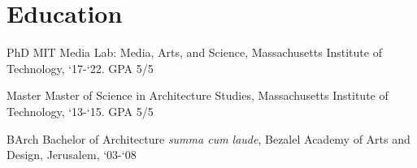 \section*{Education}

\begin{tablist}

    \item[PhD] \tab MIT Media Lab: Media, Arts, and Science, Massachusetts Institute of Technology, `17-`22. GPA 5/5
    \item[Master]  \tab Master of Science in Architecture Studies, Massachusetts Institute of Technology, `13-`15. GPA 5/5
    \item[BArch]  \tab Bachelor of Architecture \textit{summa cum laude}, Bezalel Academy of Arts and Design, Jerusalem, `03-`08

\end{tablist}

